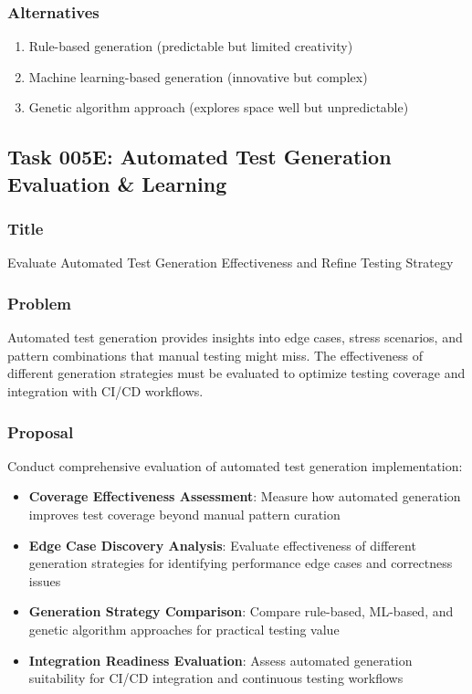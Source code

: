 \documentclass[11pt,a4paper]{article}
\begin{document}
\subsubsection{Alternatives}
\begin{enumerate}
    \item Rule-based generation (predictable but limited creativity)
    \item Machine learning-based generation (innovative but complex)
    \item Genetic algorithm approach (explores space well but unpredictable)
\end{enumerate}

\subsection{Task 005E: Automated Test Generation Evaluation \& Learning}

\subsubsection{Title}
Evaluate Automated Test Generation Effectiveness and Refine Testing Strategy

\subsubsection{Problem}
Automated test generation provides insights into edge cases, stress scenarios, and pattern combinations that manual testing might miss. The effectiveness of different generation strategies must be evaluated to optimize testing coverage and integration with CI/CD workflows.

\subsubsection{Proposal}
Conduct comprehensive evaluation of automated test generation implementation:
\begin{itemize}
    \item \textbf{Coverage Effectiveness Assessment}: Measure how automated generation improves test coverage beyond manual pattern curation
    \item \textbf{Edge Case Discovery Analysis}: Evaluate effectiveness of different generation strategies for identifying performance edge cases and correctness issues
    \item \textbf{Generation Strategy Comparison}: Compare rule-based, ML-based, and genetic algorithm approaches for practical testing value
    \item \textbf{Integration Readiness Evaluation}: Assess automated generation suitability for CI/CD integration and continuous testing workflows
\end{itemize}
\end{document}
